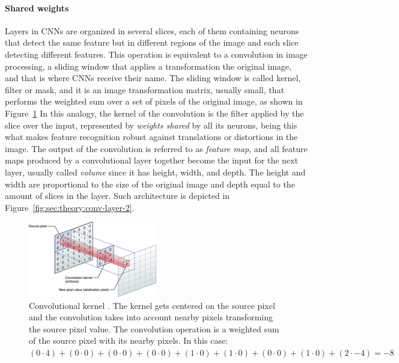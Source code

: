 \paragraph{Shared weights}
Layers in CNNs are organized in several slices, each of them containing neurons that detect the same feature but in different regions of the image and each slice detecting different features.
This operation is equivalent to a convolution in image processing, a sliding window that applies a transformation the original image, and that is where CNNs receive their name.
The sliding window is called kernel, filter or mask, and it is an image transformation matrix, usually small, that performs the weighted sum over a set of pixels of the original image, as shown in Figure~\ref{fig:sec:theory:kernel}
In this analogy, the kernel of the convolution is the filter applied by the slice over the input, represented by \emph{weights shared} by all its neurons, being this what makes feature recognition robust against translations or distortions in the image.
The output of the convolution is referred to as \emph{feature map}, and all feature maps produced by a convolutional layer together become the input for the next layer, usually called \emph{volume} since it has height, width, and depth.
The height and width are proportional to the size of the original image and depth equal to the amount of slices in the layer.
Such architecture is depicted in Figure~\ref{fig:sec:theory:conv-layer-2}.

\begin{figure}[htb]
  \begin{center}
    \includegraphics[width=0.5\textwidth]{gfx/kernel}
  \end{center}
  \caption{Convolutional kernel \cite{Apple}.
    The kernel gets centered on the source pixel and the convolution takes into account nearby pixels transforming the source pixel value.
    The convolution operation is a weighted sum of the source pixel with its nearby pixels. In this case:\\
    $(0\cdot4)+(0\cdot0)+(0\cdot0)
     +(0\cdot0)+(1\cdot0)+(1\cdot0)
     +(0\cdot0)+(1\cdot0)+(2\cdot-4) = -8$
  }
  \label{fig:sec:theory:kernel}
\end{figure}

